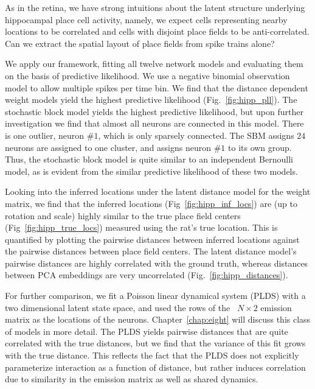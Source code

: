 As in the retina, we have strong intuitions about the latent structure
underlying hippocampal place cell activity, namely, we expect cells
representing nearby locations to be correlated and cells with disjoint
place fields to be anti-correlated. Can we extract the spatial layout
of place fields from spike trains alone?

We apply our framework, fitting all twelve network models and
evaluating them on the basis of predictive likelihood. We use a
negative binomial observation model to allow multiple spikes per time
bin. We find that the distance dependent weight models yield the
highest predictive likelihood (Fig.~\ref{fig:hipp_pll}). The
stochastic block model yields the highest predictive likelihood, but
upon further investigation we find that almost all neurons are
connected in this model. There is one outlier, neuron \#$1$, which is
only sparsely connected. The SBM assigns $24$ neurons are assigned to
one cluster, and assigns neuron \#$1$ to its own group.  Thus, the
stochastic block model is quite similar to an independent Bernoulli
model, as is evident from the similar predictive likelihood of these
two models.

Looking into the inferred locations under the latent distance model
for the weight matrix, we find that the inferred locations
(Fig~\ref{fig:hipp_inf_locs}) are (up to rotation and scale) highly
similar to the true place field centers (Fig~\ref{fig:hipp_true_locs})
measured using the rat's true location. This is quantified by plotting
the pairwise distances between inferred locations against the pairwise
distances between place field centers. The latent distance model's
pairwise distances are highly correlated with the ground truth,
whereas distances between PCA embeddings are very uncorrelated
(Fig.~\ref{fig:hipp_distances}). 

For further comparison, we fit a Poisson linear dynamical system
(PLDS) \citep{macke2011empirical} with a two dimensional latent state
space, and used the rows of the ~$N \times 2$ emission matrix as the
locations of the neurons. Chapter~\ref{chap:eight} will discuss this
class of models in more detail. The PLDS yields pairwise distances
that are quite correlated with the true distances, but we find that
the variance of this fit grows with the true distance.  This reflects
the fact that the PLDS does not explicitly parameterize interaction as
a function of distance, but rather induces correlation due to
similarity in the emission matrix as well as shared dynamics.

